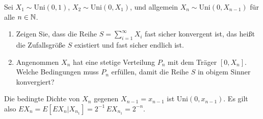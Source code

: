 
 Sei $X_{1} \sim \text{Uni}(0,1)$,
$X_2 \sim \text{Uni}(0,X_1)$, und allgemein $X_{n} \sim \text{Uni}(0,X_{n-1})$ für alle
$n \in \mathbb N$. 
\begin{enumerate}
    \item Zeigen Sie, dass die Reihe $S=\sum_{i=1}^{\infty} X_i$ fast sicher konvergent ist, das heißt
        die Zufallsgröße $S$ existiert und fast sicher endlich ist.
    \item Angenommen $X_n$ hat eine stetige Verteilung $P_n$ mit dem Träger $[0,X_n]$. Welche 
        Bedingungen muss $P_n$ erfüllen, damit die Reihe $S$ in obigem Sinner konvergiert?
\end{enumerate}

\solution Die bedingte Dichte von $X_n$ gegenen $X_{n-1} = x_{n-1}$ ist
$\text{Uni}(0,x_{n-1})$.  Es gilt also $E X_{n} = E \left[ E X_{n} | X_{n_1}
\right] = 2^{-1} \, E X_{n_1} = 2^{-n}$.



%


